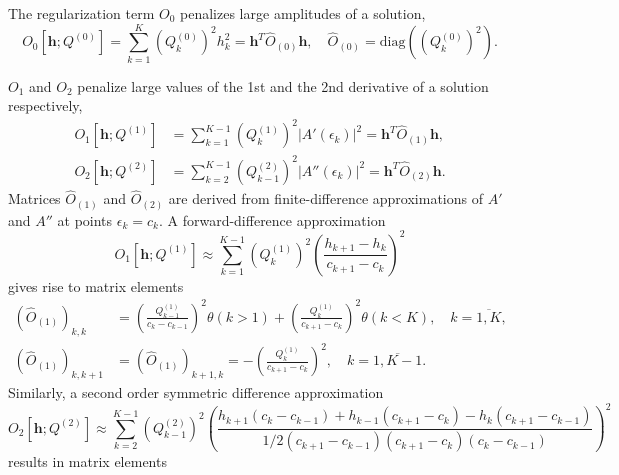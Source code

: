 \documentclass[]{article}
\begin{document}
The regularization term $O_0$ penalizes large amplitudes of a solution,
\begin{equation}
    O_0[\mathbf{h};Q^{(0)}] = \sum_{k=1}^K (Q^{(0)}_k)^2 h_k^2 =
        \mathbf{h}^T \hat O_{(0)} \mathbf{h}, \quad
        \hat O_{(0)} = \mathrm{diag}((Q^{(0)}_k)^2).
\end{equation}

$O_1$ and $O_2$ penalize large values of the 1st and the 2nd derivative of a solution respectively,
\begin{align}
    O_1[\mathbf{h};Q^{(1)}] &= \sum_{k=1}^{K-1}
        (Q^{(1)}_k)^2 |A'(\epsilon_k)|^2 =
        \mathbf{h}^T \hat O_{(1)} \mathbf{h},\\
    O_2[\mathbf{h};Q^{(2)}] &= \sum_{k=2}^{K-1}
        (Q^{(2)}_{k-1})^2 |A''(\epsilon_k)|^2 =
        \mathbf{h}^T \hat O_{(2)} \mathbf{h}.
\end{align}
Matrices $\hat O_{(1)}$ and $\hat O_{(2)}$ are derived from finite-difference approximations of $A'$ and $A''$ at points $\epsilon_k = c_k$. A forward-difference approximation
\begin{equation}\label{cc_update:finite_diff_forward}
    O_1[\mathbf{h};Q^{(1)}] \approx \sum_{k=1}^{K-1} (Q^{(1)}_k)^2
        \left(\frac{h_{k+1} - h_k}{c_{k+1} - c_k}\right)^2
\end{equation}
gives rise to matrix elements
\begin{align}
    (\hat O_{(1)})_{k,k} &=
    \left(\frac{Q^{(1)}_{k-1}}{c_k - c_{k-1}}\right)^2 \theta(k>1) +
    \left(\frac{Q^{(1)}_k}{c_{k+1} - c_{k}}\right)^2\theta(k<K),
    \quad k=\overline{1,K},\\
    (\hat O_{(1)})_{k,k+1} &= (\hat O_{(1)})_{k+1,k} =
    -\left(\frac{Q^{(1)}_k}{c_{k+1} - c_k}\right)^2, \quad k=\overline{1,K-1}.
\end{align}
Similarly, a second order symmetric difference approximation
\begin{equation}\label{cc_update:finite_diff_2_symm}
    O_2[\mathbf{h};Q^{(2)}] \approx \sum_{k=2}^{K-1} (Q^{(2)}_{k-1})^2
    \left(\frac
    {h_{k+1}(c_k - c_{k - 1}) + h_{k-1} (c_{k+1} - c_k) - h_k(c_{k+1} - c_{k-1})}
    {1/2(c_{k+1} - c_{k-1})(c_{k+1} - c_{k})(c_{k} - c_{k-1})}
    \right)^2
\end{equation}
results in matrix elements
\end{document}
